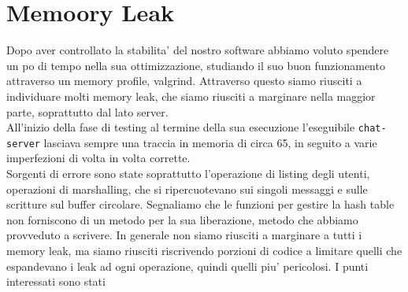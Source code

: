 \documentclass[a4paper, 11pt]{article} %
\begin{document}
\section*{Memoory Leak}
Dopo aver controllato la stabilita' del nostro software abbiamo voluto spendere un po di tempo nella sua ottimizzazione, studiando il suo buon funzionamento attraverso un memory profile, valgrind. Attraverso questo siamo riusciti a individuare molti memory leak, che siamo riusciti a marginare nella maggior parte, soprattutto dal lato server.\\
All'inizio della fase di testing al termine della sua esecuzione l'eseguibile \texttt{chat-server} lasciava sempre una traccia in memoria di circa 65, in seguito a varie imperfezioni di volta in volta corrette.\\
Sorgenti di errore sono state soprattutto l'operazione di listing degli utenti, operazioni di marshalling, che si ripercuotevano sui singoli messaggi e sulle scritture sul buffer circolare. Segnaliamo che le funzioni per gestire la hash table non forniscono di un metodo per la sua liberazione, metodo che abbiamo provveduto a scrivere.
In generale non siamo riusciti a marginare a tutti i memory leak, ma siamo riusciti riscrivendo porzioni di codice a limitare quelli che espandevano i leak ad ogni operazione, quindi quelli piu' pericolosi. I punti interessati sono stati
\end{document}
